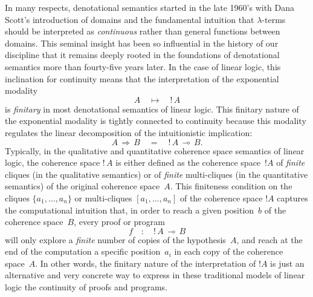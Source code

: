 \documentclass[runningheads,a4paper]{llncs}
\begin{document}
In many respects, denotational semantics started in the late 1960's with Dana Scott's introduction of domains and the fundamental intuition that
$\lambda$-terms should be interpreted as \emph{continuous} rather than general functions between domains.
This seminal insight has been so influential in the history of our discipline that it remains 
deeply rooted in the foundations of denotational semantics more than fourty-five years later.
In the case of linear logic, this inclination for continuity means that 
the interpretation of the exponential modality
$$
A \quad \mapsto \quad !\, A
$$
is \emph{finitary} in most denotational semantics of linear logic.
This finitary nature of the exponential modality is tightly connected to continuity
because this modality regulates the linear decomposition of the intuitionistic implication:
$$A \, \Rightarrow \, B \quad = \quad !\, A \, \multimap \, B.$$
Typically, in the qualitative and quantitative 
coherence space semantics of linear logic, 
the coherence space $!\,A$ is either defined as the coherence space~$!A$ 
of \emph{finite} cliques (in the qualitative semantics) or of \emph{finite} multi-cliques (in the quantitative semantics)
of the original coherence space~$A$.
This finiteness condition on the cliques $\{a_1,\dots,a_n\}$ or multi-cliques $[a_1,\dots,a_n]$ of the coherence space $!A$ 
captures the computational intuition that, in order to reach a given position~$b$ of the coherence space~$B$,
every proof or program
$$
f \quad : \quad !\, A \, \multimap \, B
$$
will only explore a \emph{finite} number of copies of the hypothesis~$A$, 
and reach at the end of the computation a specific position~$a_i$ in each copy of the coherence space~$A$.
In other words, the finitary nature of the interpretation of $!A$ is just an alternative
and very concrete way to express in these traditional models of linear logic
the continuity of proofs and programs.
\end{document}
